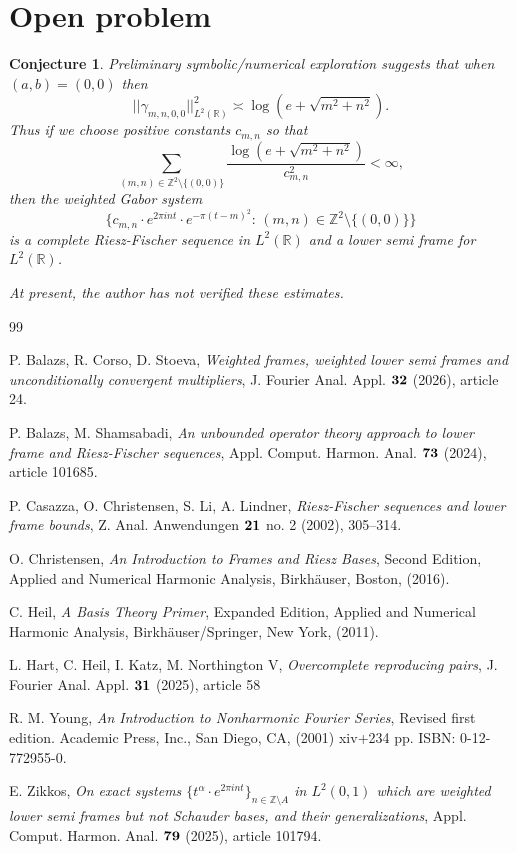 \documentclass[11pt, a4paper]{article}
\newtheorem{conjecture}{Conjecture}[section]
\begin{document}
\section{Open problem}

\begin{conjecture}
Preliminary symbolic/numerical exploration suggests that
when $(a,b)=(0,0)$ then
\[
||\gamma_{m,n,0,0}||_{L^2(\mathbb{R})}^2 \asymp \log (e+\sqrt{m^2+n^2}).
\]
Thus if we choose positive constants $c_{m,n}$ so that
\[
\sum_{(m,n)\in \mathbb{Z}^2\setminus\{(0,0)\}}\frac{ \log (e+\sqrt{m^2+n^2})  }{c_{m,n}^2}<\infty,
\]
then the weighted Gabor system
\[
\{c_{m,n}\cdot  e^{2\pi int}\cdot e^{-\pi(t-m)^2}:\, (m,n)\in \mathbb{Z}^2\setminus\{(0,0)\}\}
\]
is a complete Riesz-Fischer sequence in $L^2 (\mathbb{R})$ and a lower semi frame for $L^2(\mathbb{R})$.

At present, the author has not verified these estimates.
\end{conjecture}


\begin{thebibliography}{99}

 P. Balazs, R. Corso, D. Stoeva,
\textit{Weighted frames, weighted lower semi frames and unconditionally convergent multipliers},
J. Fourier Anal. Appl. $\bf 32$ (2026), article 24.

 P. Balazs, M. Shamsabadi,
\textit{An unbounded operator theory approach to lower frame and Riesz-Fischer sequences},
Appl. Comput. Harmon. Anal. $\bf 73$ (2024), article 101685.

  P. Casazza, O. Christensen, S. Li, A. Lindner,
\textit{Riesz-Fischer sequences and lower frame bounds},
Z. Anal. Anwendungen  $\bf 21$ no. 2 (2002), 305--314.

 O. Christensen,
\textit{An Introduction to Frames and Riesz Bases},
Second Edition, Applied and Numerical Harmonic Analysis, Birkh\"{a}user, Boston, (2016).

 C. Heil,
\textit{A Basis Theory Primer},
Expanded Edition, Applied and Numerical Harmonic Analysis, Birkh\"{a}user/Springer, New York, (2011).

 L. Hart, C. Heil, I. Katz, M. Northington V,
\textit{Overcomplete reproducing pairs}, J. Fourier Anal. Appl. $\bf 31$ (2025), article 58

 R. M. Young,
\textit{An Introduction to Nonharmonic Fourier Series},
Revised first edition. Academic Press, Inc., San Diego, CA, (2001) xiv+234 pp. ISBN: 0-12-772955-0.

  E. Zikkos,
\textit{On exact systems $\{t^{\alpha}\cdot e^{2\pi i nt}\}_{n\in\mathbb{Z}\setminus A}$ in $L^2(0,1)$ which are weighted lower semi frames but not Schauder bases, and their generalizations},
Appl. Comput. Harmon. Anal. $\bf 79$ (2025), article 101794.

\end{thebibliography}
\end{document}
